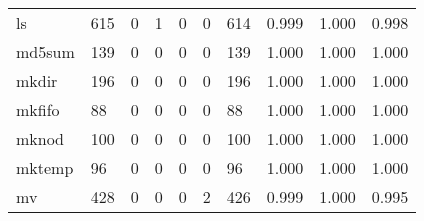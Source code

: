 \begin{longtable}{lp{2.0cm}p{2.0cm}p{2.0cm}p{2.0cm}p{2.0cm}p{2.0cm}p{2.0cm}p{2.0cm}p{2.0cm}}
ls        &                    615 &                                             0 &                                            1 &                                           0 &                                            0 &                                        614 &                                0.999 &                                  1.000 &                                0.998 \\
md5sum    &                    139 &                                             0 &                                            0 &                                           0 &                                            0 &                                        139 &                                1.000 &                                  1.000 &                                1.000 \\
mkdir     &                    196 &                                             0 &                                            0 &                                           0 &                                            0 &                                        196 &                                1.000 &                                  1.000 &                                1.000 \\
mkfifo    &                     88 &                                             0 &                                            0 &                                           0 &                                            0 &                                         88 &                                1.000 &                                  1.000 &                                1.000 \\
mknod     &                    100 &                                             0 &                                            0 &                                           0 &                                            0 &                                        100 &                                1.000 &                                  1.000 &                                1.000 \\
mktemp    &                     96 &                                             0 &                                            0 &                                           0 &                                            0 &                                         96 &                                1.000 &                                  1.000 &                                1.000 \\
mv        &                    428 &                                             0 &                                            0 &                                           0 &                                            2 &                                        426 &                                0.999 &                                  1.000 &                                0.995 \\

\end{longtable}
